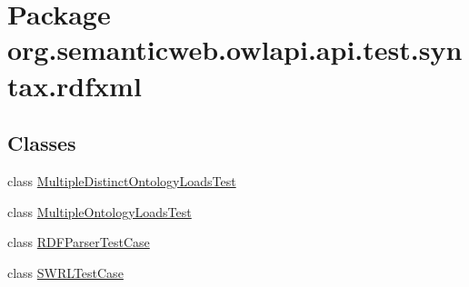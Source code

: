 \hypertarget{namespaceorg_1_1semanticweb_1_1owlapi_1_1api_1_1test_1_1syntax_1_1rdfxml}{\section{Package org.\-semanticweb.\-owlapi.\-api.\-test.\-syntax.\-rdfxml}
\label{namespaceorg_1_1semanticweb_1_1owlapi_1_1api_1_1test_1_1syntax_1_1rdfxml}
}
\subsection*{Classes}
\begin{DoxyCompactItemize}
\item 
class \hyperlink{classorg_1_1semanticweb_1_1owlapi_1_1api_1_1test_1_1syntax_1_1rdfxml_1_1_multiple_distinct_ontology_loads_test}{Multiple\-Distinct\-Ontology\-Loads\-Test}
\item 
class \hyperlink{classorg_1_1semanticweb_1_1owlapi_1_1api_1_1test_1_1syntax_1_1rdfxml_1_1_multiple_ontology_loads_test}{Multiple\-Ontology\-Loads\-Test}
\item 
class \hyperlink{classorg_1_1semanticweb_1_1owlapi_1_1api_1_1test_1_1syntax_1_1rdfxml_1_1_r_d_f_parser_test_case}{R\-D\-F\-Parser\-Test\-Case}
\item 
class \hyperlink{classorg_1_1semanticweb_1_1owlapi_1_1api_1_1test_1_1syntax_1_1rdfxml_1_1_s_w_r_l_test_case}{S\-W\-R\-L\-Test\-Case}
\end{DoxyCompactItemize}

